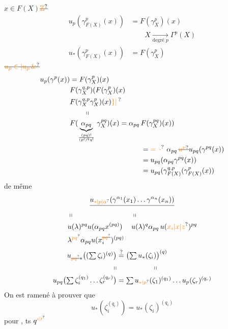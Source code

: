 $x\in F(X)$\qquad $\deleted{\unsure{\mathbb Z}}$
\[
\begin{aligned}
u_p(\gamma^p_{F(X)}(x))&=F(\gamma^p_X)(x)\\
&\qquad X\xrightarrow[\text{degré }p]{}\Gamma^p(X)\\
u_*(\gamma^p_{F(X)}(x))&=F(\gamma^p_X)
\end{aligned}
\]
$\deleted{\unsure{u_p\in|u_p\,\&}}$
\[
\begin{aligned}
u_p(\gamma^p(x))&=F(\gamma^p_X)(x)\\
&F(\gamma_X^{q,p})(F(\gamma^p_X)(x)\\
&F(\gamma_X^{q,p}\gamma^p_X)(x)\unsure{\}|\,}\\
&\hspace{2em}\shortparallel\\
&F(\underbrace{\alpha_{pq}}_{\frac{(pq)!}{(p!)^q q!}}\,\gamma_X^{pq})(x)=\alpha_{pq}\,F(\gamma_X^{pq})(x))\\
&\hspace{10em}=\unsure{=\,{\cdot}}\ \alpha_{pq}\,\deleted{\unsure{u^p}}u_{pq}(\gamma^{pq}(x))\\
&\hspace{10em}=u_{pq}(\alpha_{pq}\gamma^{pq}(x))\\
&\hspace{10em}=u_{pq}(\gamma^{q,p}_{F(X)}(\gamma^p_{F(X)}(x))
\end{aligned}
\]
de même 
\[
\underline{u_{\unsure{*|p|\alpha}}(\gamma^{\alpha_1}(x_1)\ldots\gamma^{\alpha_n}(x_n))}
\]
\[
\begin{aligned}
&\shortparallel &&\shortparallel\\
&u(\lambda)^{pq}u(\alpha_{pq}x^{(pq)})&&u(\lambda)^q\alpha_{pq}\,u(\unsure{x_i|x|z})^{pq}\\
&\lambda^{\unsure{pq}}\alpha_{pq}u(x_i^{\deleted{\unsure{pq}}})^{(pq)}
\end{aligned}
\]
\[
\begin{aligned}
u_{\deleted{\unsure{pq}}*}\bigl((\textstyle\sum\zeta_i)^{(q)}\bigr)&\overset{?}{=}\bigl(\textstyle\sum u_*(\zeta_i)\bigr)^{(q)}\\
\shortparallel&\hspace{5em}\shortparallel\\
u_{pq}\bigl(\textstyle\sum\zeta_i^{(q_1)}\ldots\zeta_r^{(q_r)}\bigr)&=\textstyle\sum u_{\unsure{*|p}}(\zeta_1)^{(q_1)}\ldots u_p(\zeta_r)^{(q_r)}
\end{aligned}
\]
On est ramené à prouver que
\[
u_*(\zeta_i^{(q_i)})=u_*(\zeta_i)^{(q_i)}
\]
pour  , ts $q^{\unsure{i|\prime}}$

